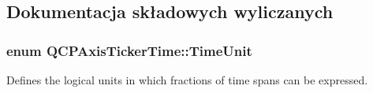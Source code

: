 \subsection{Dokumentacja składowych wyliczanych}
\subsubsection[{\texorpdfstring{Time\+Unit}{TimeUnit}}]{\setlength{\rightskip}{0pt plus 5cm}enum {\bf Q\+C\+P\+Axis\+Ticker\+Time\+::\+Time\+Unit}}\hypertarget{class_q_c_p_axis_ticker_time_a5c48ded8c6d3a1aca9b68219469fea3e}{}\label{class_q_c_p_axis_ticker_time_a5c48ded8c6d3a1aca9b68219469fea3e}
Defines the logical units in which fractions of time spans can be expressed.

